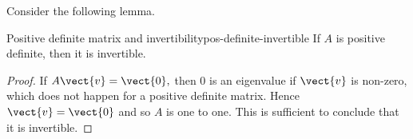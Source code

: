 
Consider the following lemma.

\begin{lemma}{Positive definite matrix and invertibility}{pos-definite-invertible}
If $A$ is positive definite, then it is invertible.
\end{lemma}

\begin{proof}
If $A\vect{v}=\vect{0},$ then $0$ is an eigenvalue if $\vect{v}$ is non-zero, which
does not happen for a positive definite matrix. Hence $\vect{v}=\vect{0}$ and
so $A$ is one to one. This is sufficient to conclude that it is invertible.
\end{proof}

